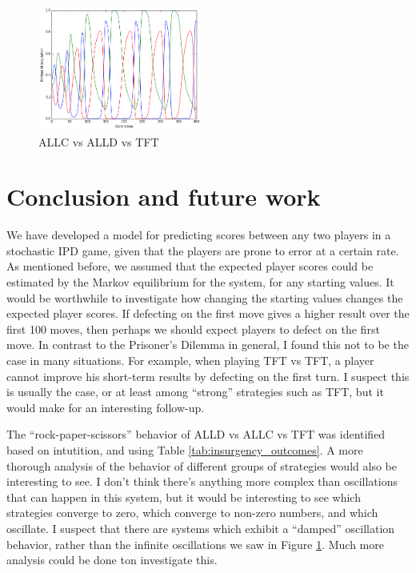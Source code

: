 \documentclass{article}
\begin{document}
\begin{figure}[h]
\begin{center}\includegraphics[width=0.48\textwidth]{multi_player_dynamics.png}
\end{center}\caption{ALLC vs ALLD vs TFT} \label{fig:multi_player_dynamics}
\end{figure}

\section{Conclusion and future work}
We have developed a model for predicting scores between any two players in a stochastic IPD game, given that the players are prone to error at a certain rate. As mentioned before, we assumed that the expected player scores could be estimated by the Markov equilibrium for the system, for any starting values. It would be worthwhile to investigate how changing the starting values changes the expected player scores. If defecting on the first move gives a higher result over the first 100 moves, then perhaps we should expect players to defect on the first move. In contrast to the Prisoner's Dilemma in general, I found this not to be the case in many situations. For example, when playing TFT vs TFT, a player cannot improve his short-term results by defecting on the first turn. I suspect this is usually the case, or at least among ``strong'' strategies such as TFT, but it would make for an interesting follow-up.

The ``rock-paper-scissors'' behavior of ALLD vs ALLC vs TFT was identified based on intutition, and using Table \ref{tab:insurgency_outcomes}. A more thorough analysis of the behavior of different groups of strategies would also be interesting to see. I don't think there's anything more complex than oscillations that can happen in this system, but it would be interesting to see which strategies converge to zero, which converge to non-zero numbers, and which oscillate. I suspect that there are systems which exhibit a ``damped'' oscillation behavior, rather than the infinite oscillations we saw in Figure \ref{fig:multi_player_dynamics}. Much more analysis could be done ton investigate this.
\end{document}
